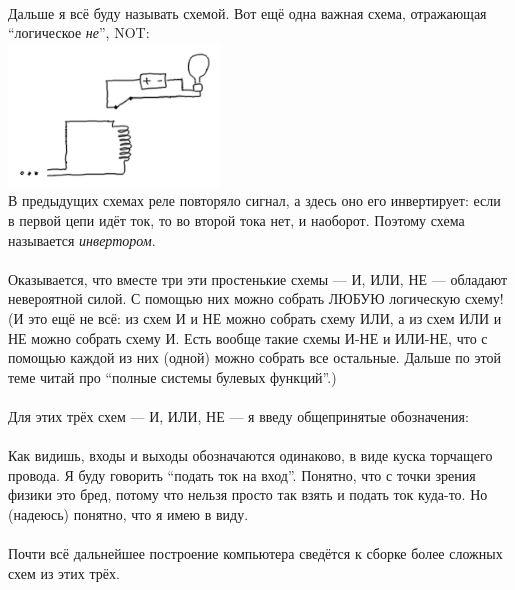 \documentclass[11pt]{book}
\begin{document}
\\
Дальше я всё буду называть схемой. Вот ещё одна важная схема, отражающая ``логическое \emph{не}'', NOT:
\\
\includegraphics[height=1.5in]{pic/17.png}
\\
В предыдущих схемах реле повторяло сигнал, а здесь оно его инвертирует: если в первой цепи идёт ток, то во второй тока нет, и наоборот.
Поэтому схема называется \emph{инвертором}.
\\ \\
Оказывается, что вместе три эти простенькие схемы --- И, ИЛИ, НЕ --- обладают невероятной силой.
С помощью них можно собрать ЛЮБУЮ логическую схему! (И это ещё не всё: из схем И и НЕ можно
собрать схему ИЛИ, а из схем ИЛИ и НЕ можно собрать схему И. Есть вообще такие схемы И-НЕ и ИЛИ-НЕ,
что с помощью каждой из них (одной) можно собрать все остальные. Дальше по этой
теме читай про ``полные системы булевых функций''.)
\\ \\
Для этих трёх схем --- И, ИЛИ, НЕ --- я введу общепринятые обозначения:
\\ \\
Как видишь, входы и выходы обозначаются одинаково, в виде куска торчащего
провода. Я буду говорить ``подать ток на вход''. Понятно, что с точки зрения физики это
бред, потому что нельзя просто так взять и подать ток куда-то. Но (надеюсь) понятно,
что я имею в виду.
\\ \\
Почти всё дальнейшее построение компьютера сведётся к сборке более сложных схем
из этих трёх.
\end{document}
